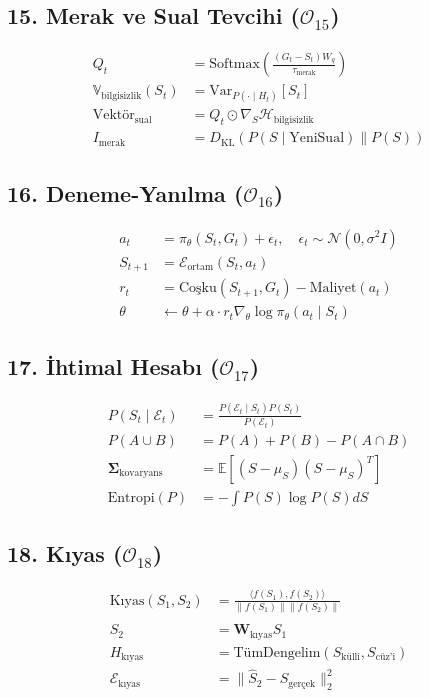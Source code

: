 \documentclass[11pt, a4paper]{article}
\begin{document}
\subsection{15. Merak ve Sual Tevcihi ($\mathcal{O}_{15}$)}
\begin{align}
Q_t &= \text{Softmax}\left( \frac{(G_t - S_t) W_q}{\tau_{\text{merak}}} \right) \\
\mathbb{V}_{\text{bilgisizlik}}(S_t) &= \text{Var}_{P(\cdot \mid H_t)}[S_t] \\
\text{Vektör}_{\text{sual}} &= Q_t \odot \nabla_{S} \mathcal{H}_{\text{bilgisizlik}} \\
I_{\text{merak}} &= D_{\text{KL}}\left( P(S \mid \text{YeniSual}) \parallel P(S) \right)
\end{align}

\subsection{16. Deneme-Yanılma ($\mathcal{O}_{16}$)}
\begin{align}
a_t &= \pi_\theta(S_t, G_t) + \epsilon_t, \quad \epsilon_t \sim \mathcal{N}(0, \sigma^2 I) \\
S_{t+1} &= \mathcal{E}_{\text{ortam}}(S_t, a_t) \\
r_t &= \text{Coşku}(S_{t+1}, G_t) - \text{Maliyet}(a_t) \\
\theta &\leftarrow \theta + \alpha \cdot r_t \nabla_\theta \log \pi_\theta(a_t \mid S_t)
\end{align}

\subsection{17. İhtimal Hesabı ($\mathcal{O}_{17}$)}
\begin{align}
P(S_t \mid \mathcal{E}_t) &= \frac{P(\mathcal{E}_t \mid S_t) P(S_t)}{P(\mathcal{E}_t)} \\
P(A \cup B) &= P(A) + P(B) - P(A \cap B) \\
\mathbf{\Sigma}_{\text{kovaryans}} &= \mathbb{E}\left[ (S - \mu_S)(S - \mu_S)^T \right] \\
\text{Entropi}(P) &= -\int P(S) \log P(S) dS
\end{align}

\subsection{18. Kıyas ($\mathcal{O}_{18}$)}
\begin{align}
\text{Kıyas}(S_1, S_2) &= \frac{\langle f(S_1), f(S_2) \rangle}{\|f(S_1)\| \|f(S_2)\|} \\
\hat{S}_2 &= \mathbf{W}_{\text{kıyas}} S_1 \\
H_{\text{kıyas}} &= \text{TümDengelim}(S_{\text{küllî}}, S_{\text{cüz'î}}) \\
\mathcal{E}_{\text{kıyas}} &= \| \hat{S}_2 - S_{\text{gerçek}} \|_2^2
\end{align}
\end{document}

